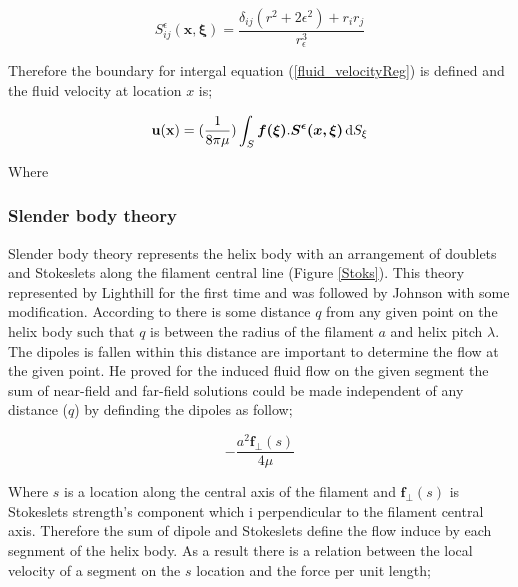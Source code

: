 \documentclass[12pt,a4paper,titlepage]{report}
\begin{document}
\begin{equation}
 S _{ij}^{\epsilon} \bm{(x , \xi)} = \frac{\delta _{ij}(r^2 + 2{\epsilon}^2) + r_i r_j}{r_{\epsilon}^3}
\label{velocity-tensor}
\end{equation}

Therefore the boundary for intergal equation (\ref{fluid_velocityReg}) is defined and the fluid velocity at location $x$ is;

\begin{equation}
\bold {u(x)} =(\frac{1}{8 \pi \mu}) \int_S \mathrm \bm{f(\xi)} . \bm{S^{\epsilon}( x, \xi)}\, \mathrm{d}S_{\xi}
\label{fluid_velocityReg}
\end{equation}

Where 



\subsubsection{Slender body theory}\label{method1}

Slender body theory represents the helix body with an arrangement of
 doublets and Stokeslets along the filament central line (Figure \ref{Stoks}). This theory represented by 
Lighthill for the first time and was followed by Johnson with some modification. According to \citeauthor{lighthill1971large}
there is some distance $q$ from any given point on the helix body such that $q$ is between the radius of the
filament $a$ and helix pitch $\lambda$. The dipoles is fallen within this distance are important to determine the flow at the
given point. He proved for the induced fluid flow on the given segment 
the sum of near-field and far-field solutions could be made independent of any distance ($q$) by definding
the dipoles as follow;

  

\begin{equation}
-\frac{a^2 \bm{f}_\perp (s)}{4\mu}
\label{dipole}
\end{equation}

Where $s$ is a location along the central axis of the filament and $\bm{f}_\perp (s)$ is Stokeslets strength\rq{}s
component which i perpendicular to the filament central axis. Therefore the sum of dipole and Stokeslets
define the flow induce by each segnment of the helix body. As a result there is a relation between 
the local velocity of a segment on the $s$ location and the force per unit length;
\end{document}
